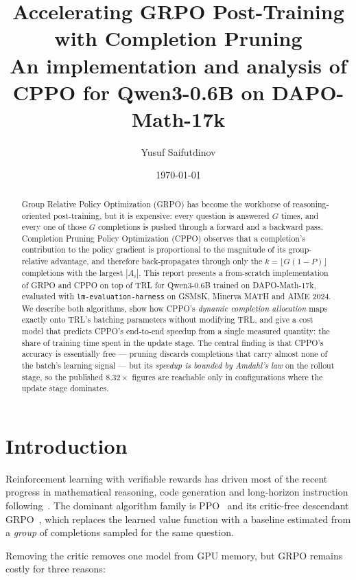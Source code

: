 \documentclass[11pt,a4paper]{article}
\title{\textbf{Accelerating GRPO Post-Training with Completion Pruning}\\
\large An implementation and analysis of CPPO for Qwen3-0.6B on DAPO-Math-17k}
\author{Yusuf Saifutdinov}
\date{\today}
\newcommand{\Adv}{A}
\begin{document}
\maketitle

\begin{abstract}
Group Relative Policy Optimization (GRPO) has become the workhorse of
reasoning-oriented post-training, but it is expensive: every question is
answered $G$ times, and every one of those $G$ completions is pushed through a
forward and a backward pass. Completion Pruning Policy Optimization (CPPO)
observes that a completion's contribution to the policy gradient is
proportional to the magnitude of its group-relative advantage, and therefore
back-propagates through only the $k = \lfloor G(1-P) \rfloor$ completions with
the largest $|\Adv_i|$. This report presents a from-scratch implementation of
GRPO and CPPO on top of TRL for Qwen3-0.6B trained on DAPO-Math-17k, evaluated
with \texttt{lm-evaluation-harness} on GSM8K, Minerva MATH and AIME 2024. We
describe both algorithms, show how CPPO's \emph{dynamic completion allocation}
maps exactly onto TRL's batching parameters without modifying TRL, and give a
cost model that predicts CPPO's end-to-end speedup from a single measured
quantity: the share of training time spent in the update stage. The central
finding is that CPPO's accuracy is essentially free --- pruning discards
completions that carry almost none of the batch's learning signal --- but its
\emph{speedup is bounded by Amdahl's law} on the rollout stage, so the
published $8.32\times$ figures are reachable only in configurations where the
update stage dominates.
\end{abstract}

\tableofcontents

\section{Introduction}
\label{sec:intro}

Reinforcement learning with verifiable rewards has driven most of the recent
progress in mathematical reasoning, code generation and long-horizon
instruction following~\cite{deepseekai2025r1,yu2025dapo}. The dominant
algorithm family is PPO~\cite{schulman2017ppo} and its critic-free descendant
GRPO~\cite{shao2024deepseekmath}, which replaces the learned value function
with a baseline estimated from a \emph{group} of completions sampled for the
same question.

Removing the critic removes one model from GPU memory, but GRPO remains
costly for three reasons:
\end{document}
